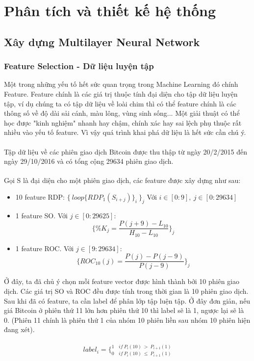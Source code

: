 \chapter{Phân tích và thiết kế hệ thống}

\section{Xây dựng Multilayer Neural Network}
\subsection{Feature Selection - Dữ liệu luyện tập}
Một trong những yếu tố hết sức quan trọng trong Machine Learning đó chính Feature. 
Feature chính là các giá trị thuộc tính đại diện cho tập dữ liệu luyện tập, ví dụ 
chúng ta có tập dữ liệu về loài chim thì có thể feature chính là các thông số 
về độ dài sải cánh, màu lông, vùng sinh sống... Một giải thuật có thể học được 
"kinh nghiệm" nhanh hay chậm, chính xác hay sai lệch phụ thuộc rất nhiều vào yếu 
tố feature. Vì vậy quá trình khai phá dữ liệu là hết sức cần chú ý.\\\\
Tập dữ liệu về các phiên giao dịch Bitcoin được thu thập từ ngày 20/2/2015 đến 
ngày 29/10/2016 và có tổng cộng 29634 phiên giao dịch.\\\\
Gọi S là đại diện cho một phiên giao dịch, các feature được xây dựng như sau:
\begin{itemize}
    \item 10 feature RDP: $\{ \: loop\{ RDP_1(S_{i+j})\}_i \: \}_j$ Với 
    $i \in [0:9], \: j \in [0:29634]$
    \item 1 feature SO. Với $ j \in [0:29625] $:\\
    \[
        \{ \%K_j = \frac{P(j+9)-L_{10}}{H_{10}-L_{10}} \}_j
    \]
    \item 1 feature ROC. Với $ j \in [9:29634] $:\\ 
    \[
        \{ ROC_{10}(j)= \frac{P(j) - P(j-9)}{P(j-9)} \}_j
    \]
\end{itemize}
Ở đây, ta đã chủ ý chọn mỗi feature vector được hình thành bởi 10 phiên giao 
dịch. Các giá trị SO và ROC đều được tính trong thời gian là 10 phiên giao dịch.
Sau khi đã có feature, ta cần label để phân lớp tập luện tập. Ở đây đơn giản, 
nếu giá Bitcoin ở phiên thứ 11 lớn hơn phiên thứ 10 thì label sẽ là 1, ngược
lại sẽ là 0. (Phiên 11 chính là phiên thứ 1 của nhóm 10 phiên liền sau nhóm 
10 phiên hiện đang xét).\\\\
\[
    label_i = \bigg \{ _{0 \quad if \: P_i(10) \: \leq \: P_{i+1}(1)} ^{1 \quad if \: P_i(10) \: > \: P_{i+1}(1)}
\]
